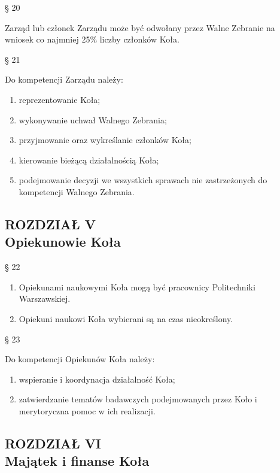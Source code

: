 \documentclass[a4paper,11pt]{article}
\renewcommand{\paragraph}[1] {\begin{center}§ {#1}\end{center}}
\newcommand{\content}[1] {\begin{flushleft}{#1}\end{flushleft}}
\newcommand{\chapter}[2] {\begin{center}\section*{ROZDZIAŁ {#1} \\ {#2}}\end{center}}
\begin{document}
\paragraph{20}
\content{Zarząd lub członek Zarządu może być odwołany przez Walne Zebranie na wniosek co najmniej
25\% liczby członków Koła.}

\paragraph{21}
\content{Do kompetencji Zarządu należy:}
\begin{enumerate}
	\item reprezentowanie Koła;
	\item wykonywanie uchwał Walnego Zebrania;
	\item przyjmowanie oraz wykreślanie członków Koła;
	\item kierowanie bieżącą działalnością Koła;
	\item podejmowanie  decyzji  we  wszystkich  sprawach  nie  zastrzeżonych  do  kompetencji
Walnego Zebrania.
\end{enumerate}

\chapter{V}{Opiekunowie Koła}

\paragraph{22}
\begin{enumerate}
	\item Opiekunami naukowymi Koła mogą być pracownicy Politechniki Warszawskiej. 
	\item Opiekuni naukowi Koła wybierani są na czas nieokreślony.
\end{enumerate}

\paragraph{23}
\content{Do kompetencji Opiekunów Koła należy:}
\begin{enumerate}
	\item wspieranie i koordynacja działalność Koła;
	\item zatwierdzanie  tematów  badawczych  podejmowanych  przez  Koło  i  merytoryczna
pomoc w ich realizacji.
\end{enumerate}

\chapter{VI}{Majątek i finanse Koła}
\end{document}
